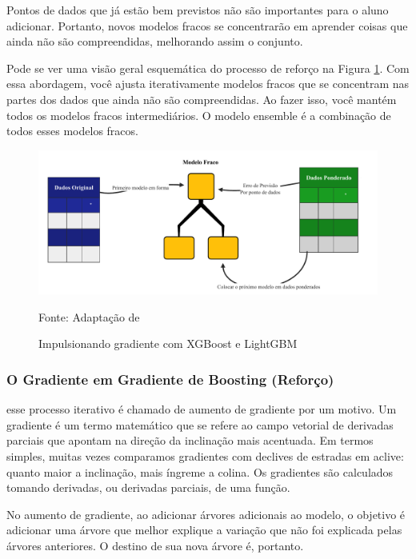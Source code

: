 Pontos de dados que já estão bem previstos não são importantes para o aluno adicionar. Portanto, novos modelos fracos se concentrarão em aprender coisas que ainda não são compreendidas, melhorando assim o conjunto.

Pode se ver uma visão geral esquemática do processo de reforço na Figura \ref{fig:xgboos}. Com essa abordagem, você ajusta iterativamente modelos fracos que se concentram nas partes dos dados que ainda
não são compreendidas. Ao fazer isso, você mantém todos os modelos fracos intermediários. O modelo ensemble é a combinação de todos esses modelos fracos.


\begin{figure}[H]
	\centering
	\caption{Impulsionando gradiente com XGBoost e LightGBM}
	\label{fig:xgboos}
	\includegraphics[width=0.9\linewidth]{Modelos/Figuras/xgboos}
	
	Fonte: Adaptação de 
\end{figure}



\subsubsection{O Gradiente em Gradiente de Boosting (Refor\c co)} \label{subsubsec:boosting}

 esse processo iterativo é chamado de aumento de gradiente por um motivo. Um gradiente é um termo matemático que se refere ao campo vetorial de derivadas parciais que apontam na direção da inclinação mais acentuada. Em termos simples, muitas vezes comparamos gradientes com declives de estradas em aclive: quanto maior a inclinação, mais íngreme a colina. Os gradientes são calculados tomando derivadas, ou derivadas parciais, de uma função.

No aumento de gradiente, ao adicionar árvores adicionais ao modelo, o objetivo é adicionar uma árvore que melhor explique a variação que não foi explicada pelas árvores anteriores. O destino de sua nova árvore é, portanto.

